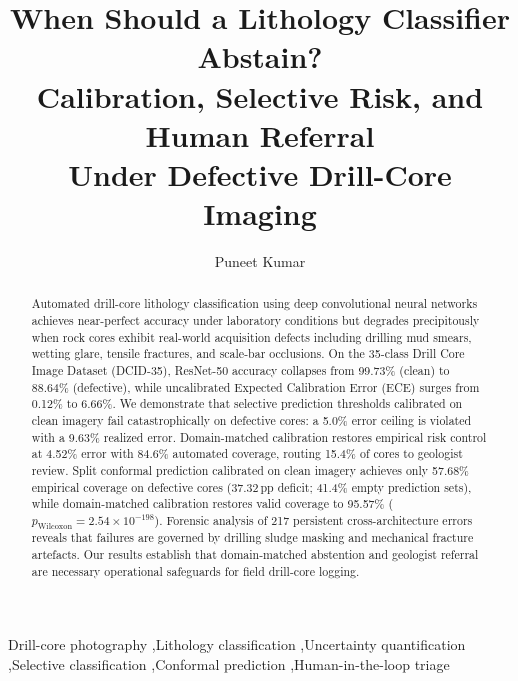 \documentclass[5p,times,twocolumn]{elsarticle}
\begin{document}
\begin{frontmatter}

\title{When Should a Lithology Classifier Abstain?\\[4pt]
       Calibration, Selective Risk, and Human Referral\\
       Under Defective Drill-Core Imaging}

\author[1]{Puneet Kumar}

\begin{abstract}
Automated drill-core lithology classification using deep convolutional neural networks
achieves near-perfect accuracy under laboratory conditions but degrades precipitously when
rock cores exhibit real-world acquisition defects including drilling mud smears, wetting
glare, tensile fractures, and scale-bar occlusions.
On the 35-class Drill Core Image Dataset (DCID-35), ResNet-50 accuracy collapses from
99.73\% (clean) to 88.64\% (defective), while uncalibrated Expected Calibration Error
(ECE) surges from 0.12\% to 6.66\%.
We demonstrate that selective prediction thresholds calibrated on clean imagery fail
catastrophically on defective cores: a 5.0\% error ceiling is violated with a 9.63\%
realized error.
Domain-matched calibration restores empirical risk control at 4.52\% error with 84.6\%
automated coverage, routing 15.4\% of cores to geologist review.
Split conformal prediction calibrated on clean imagery achieves only 57.68\% empirical
coverage on defective cores (37.32\,pp deficit; 41.4\% empty prediction sets), while
domain-matched calibration restores valid coverage to 95.57\%
($p_{\text{Wilcoxon}} = 2.54\times10^{-198}$).
Forensic analysis of 217 persistent cross-architecture errors reveals that failures are
governed by drilling sludge masking and mechanical fracture artefacts.
Our results establish that domain-matched abstention and geologist referral are necessary
operational safeguards for field drill-core logging.
\end{abstract}

\begin{keyword}
Drill-core photography \sep Lithology classification \sep Uncertainty quantification
\sep Selective classification \sep Conformal prediction \sep Human-in-the-loop triage
\end{keyword}

\end{frontmatter}
\end{document}
